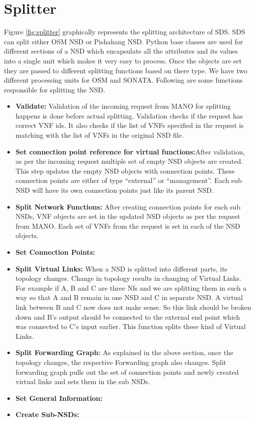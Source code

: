 \newpage

\section{Splitter}
Figure \ref{fig:splitter} graphically represents the splitting architecture of SDS. SDS can split either OSM NSD or Pishahang NSD. Python base classes are used for different sections of a NSD which encapsulate all the attributes and its values into a single unit which makes it very easy to process. Once the objects are set they are passed to different splitting functions based on there type. We have two different processing units for OSM and SONATA. Following are some functions responsible for splitting the NSD.

\begin{itemize}
	\item \textbf{Validate: }Validation of the incoming request from MANO for splitting happens is done before actual splitting. Validation checks if the request has correct VNF ids. It also checks if the list of VNFs specified in the request is matching with the list of VNFs in the original NSD file.
	\item \textbf{Set connection point reference for virtual functions:}After validation, as per the incoming request multiple set of empty NSD objects are created. This step updates the empty NSD objects with connection points. These connection points are either of type “external” or “management”. Each sub NSD will have its own connection points just like its parent NSD.
	\item \textbf{Split Network Functions: }After creating connection points for each sub NSDs, VNF objects are set in the updated NSD objects as per the request from MANO. Each set of VNFs from the request is set in each of the NSD objects. 
	\item \textbf{Set Connection Points: }
	\item \textbf{Split Virtual Links: }When a NSD is splitted into different parts, its topology changes. Change in topology results in changing of Virtual Links. For example if A, B and C are three Nfs and we are splitting them in such a way so that A and B remain in one NSD and C in separate NSD. A virtual link between B and C now does not make sense. So this link should be broken down and B’s output should be connected to the external end point which was connected to C’s input earlier. This function splits these kind of Virtual Links.
	\item \textbf{Split Forwarding Graph: }As explained in the above section, once the topology changes, the respective Forwarding graph also changes. Split forwarding graph pulls out the set of connection points and newly created virtual links and sets them in the sub NSDs.
	\item \textbf{Set General Information: }
	\item \textbf{Create Sub-NSDs: }
\end{itemize} 

